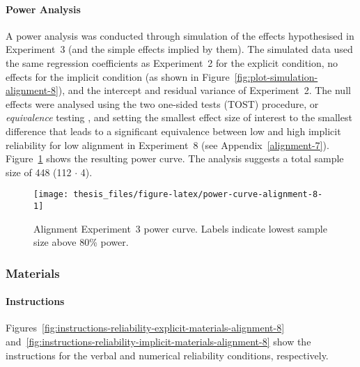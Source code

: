 \documentclass[a4paper, nobind]{templates/ociamthesis}
\newcommand{\blandscape}{\begin{landscape}}
\newcommand{\elandscape}{\end{landscape}}
\theoremstyle{definition}
\theoremstyle{definition}
\theoremstyle{definition}
\theoremstyle{definition}
\theoremstyle{remark}
\begin{document}
\hypertarget{power-analysis-alignment-8}{%
\paragraph{Power Analysis}\label{power-analysis-alignment-8}}

A power analysis was conducted through simulation of the effects hypothesised in
Experiment~3 (and the simple effects implied by them). The simulated data used
the same regression coefficients as Experiment~2 for the explicit condition, no
effects for the implicit condition (as shown in
Figure~\ref{fig:plot-simulation-alignment-8}), and the intercept and residual
variance of Experiment~2. The null effects were analysed using the two one-sided
tests (TOST) procedure, or \emph{equivalence} testing \autocite{lakens2018}, and setting the
smallest effect size of interest to the smallest difference that leads to a
significant equivalence between low and high implicit reliability for low
alignment in Experiment~8 (see Appendix~\ref{alignment-7}).
Figure~\ref{fig:power-curve-alignment-8} shows the resulting power curve. The
analysis suggests a total sample size of 448
(112 \(\cdot\) 4).

\newpage

\blandscape



\begin{figure}
\texttt{[image: thesis\_files/figure-latex/power-curve-alignment-8-1]} \caption{Alignment Experiment~3 power curve. Labels indicate lowest sample size above 80\% power.}\label{fig:power-curve-alignment-8}
\end{figure}

\elandscape

\newpage

\subsubsection{Materials}

\hypertarget{instructions-materials-alignment-8-appendix}{%
\paragraph{Instructions}\label{instructions-materials-alignment-8-appendix}}

Figures~\ref{fig:instructions-reliability-explicit-materials-alignment-8}
and~\ref{fig:instructions-reliability-implicit-materials-alignment-8} show the
instructions for the verbal and numerical reliability conditions, respectively.
\end{document}
